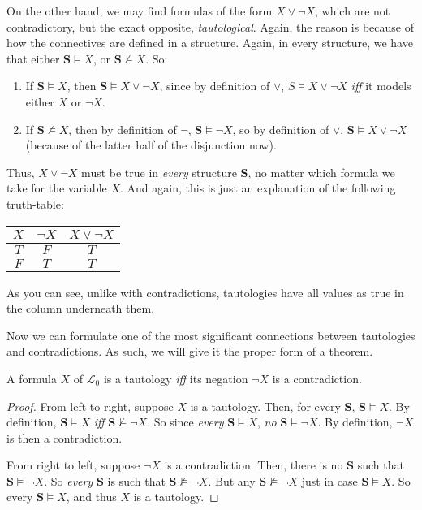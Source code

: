 On the other hand, we may find formulas of the form $X \vee \neg X$, which are not contradictory, but the exact opposite, \textit{tautological}. Again, the reason is because of how the connectives are defined in a structure. Again, in every structure, we have that either $\mathbf{S} \models X$, or $\mathbf{S} \not\models X$. So:

\begin{enumerate}
	\item If $\mathbf{S} \models X$, then $\mathbf{S} \models X \vee \neg X$, since by definition of $\vee$, $S \models X \vee \neg X$ \textit{iff} it models either $X$ or $\neg X$.
	\item If $\mathbf{S} \not \models X$, then by definition of $\neg$, $\mathbf{S} \models \neg X$, so by definition of $\vee$, $\mathbf{S} \models X \vee \neg X$ (because of the latter half of the disjunction now). 
\end{enumerate}

Thus, $X \vee \neg X$ must be true in \textit{every} structure $\mathbf{S}$, no matter which formula we take for the variable $X$. And again, this is just an explanation of the following truth-table:

\begin{center}
	\begin{tabular}{c|c|c}
		$X$ & $\neg X$ & $X \vee \neg X$\\ \hline
		$T$ & $F$ & $T$\\
		$F$ & $T$ & $T$
	\end{tabular}
\end{center}

As you can see, unlike with contradictions, tautologies have all values as true in the column underneath them. 

Now we can formulate one of the most significant connections between tautologies and contradictions. As such, we will give it the proper form of a theorem. 

\begin{prop}
A formula $X$ of $\mathcal{L}_0$ is a tautology \textit{iff} its negation $\neg X$ is a contradiction. \label{tautcon}
\end{prop}

\begin{proof}
From left to right, suppose $X$ is a tautology. Then, for every $\mathbf{S}$, $\mathbf{S} \models X$. By definition, $\mathbf{S} \models X$ \textit{iff} $\mathbf{S} \not\models \neg X$. So since \textit{every} $\mathbf{S} \models X$, \textit{no} $\mathbf{S} \models \neg X$. By definition, $\neg X$ is then a contradiction. 

From right to left, suppose $\neg X$ is a contradiction. Then, there is no $\mathbf{S}$ such that $\mathbf{S} \models \neg X$. So \textit{every} $\mathbf{S}$ is such that $\mathbf{S} \not\models \neg X$. But any $\mathbf{S} \not\models \neg X$ just in case $\mathbf{S} \models X$. So every $\mathbf{S} \models X$, and thus $X$ is a tautology. 
\end{proof}

